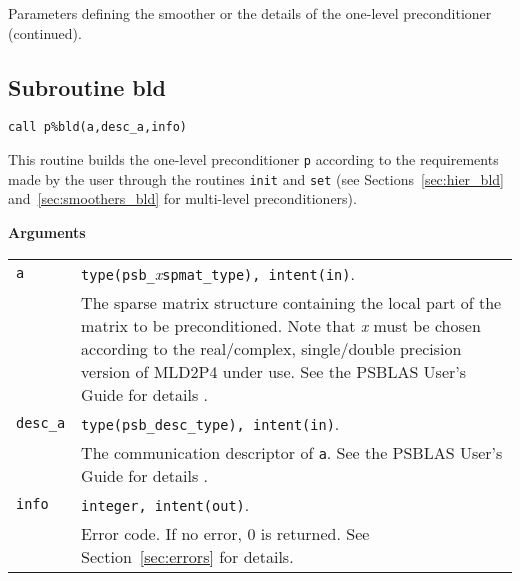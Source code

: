\caption{Parameters defining the smoother or the details of the one-level preconditioner
(continued).\label{tab:p_smoother_1}}  
\esideways

\clearpage

\subsection{Subroutine bld\label{sec:precbld}}
  
\begin{center}
\verb|call p%bld(a,desc_a,info)|\\
\end{center}

\noindent
This routine builds the one-level preconditioner \verb|p| according to the requirements
made by the user through the routines \verb|init| and \verb|set|
(see Sections~\ref{sec:hier_bld} and~\ref{sec:smoothers_bld} for multi-level preconditioners).

{\baselineskip\noindent\large\bfseries Arguments} \smallskip

\begin{tabular}{p{1.2cm}p{12cm}}
\verb|a|  & \verb|type(psb_|\emph{x}\verb|spmat_type), intent(in)|. \\
              & The sparse matrix structure containing the local part of the
                matrix to be preconditioned. Note that \emph{x} must be chosen according
                to the real/complex, single/double precision version of MLD2P4 under use.
                See the PSBLAS User's Guide for details \cite{PSBLASGUIDE}.\\
\verb|desc_a| & \verb|type(psb_desc_type), intent(in)|. \\
              & The communication descriptor of \verb|a|. See the PSBLAS User's Guide for
                details \cite{PSBLASGUIDE}.\\
\verb|info|   & \verb|integer, intent(out)|.\\
              & Error code. If no error, 0 is returned. See Section~\ref{sec:errors} for details.\\
\end{tabular}

